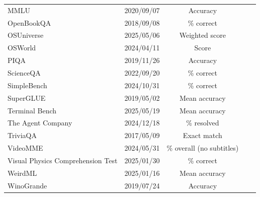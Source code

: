 \documentclass[11pt]{article}
\begin{document}
\begin{table}[htbp]
{\begin{tabular}{@{} l c c c c @{}}
        MMLU & 2020/09/07 & Accuracy &  \\
        OpenBookQA & 2018/09/08 & \% correct &  \\
        OSUniverse & 2025/05/06 & Weighted score &  \\
        OSWorld & 2024/04/11 & Score &  \\
        PIQA & 2019/11/26 & Accuracy &  \\
        ScienceQA & 2022/09/20 & \% correct &  \\
        SimpleBench & 2024/10/31 & \% correct &  \\
        SuperGLUE & 2019/05/02 & Mean accuracy &  \\
        Terminal Bench & 2025/05/19 & Mean accuracy &  \\
        The Agent Company & 2024/12/18 & \% resolved &  \\
        TriviaQA & 2017/05/09 & Exact match &  \\
        VideoMME & 2024/05/31 & \% overall (no subtitles) &  \\
        Visual Physics Comprehension Test & 2025/01/30 & \% correct &  \\
        WeirdML & 2025/01/16 & Mean accuracy &  \\
        WinoGrande & 2019/07/24 & Accuracy &  \\
        \bottomrule
    \end{tabular}
}
\end{table}
\end{document}

